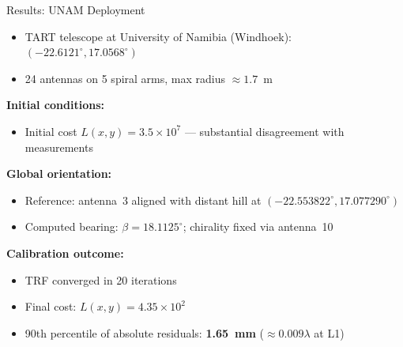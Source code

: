 \documentclass[ignorenonframetext]{beamer}
\begin{document}
\begin{frame}{Results: UNAM Deployment}
\vspace{-4pt}
\begin{itemize}
  \item TART telescope at University of Namibia (Windhoek): $(-22.6121^\circ, 17.0568^\circ)$
  \item 24 antennas on 5 spiral arms, max radius $\approx 1.7$~m
\end{itemize}
\vspace{4pt}
\textbf{Initial conditions:}
\begin{itemize}
  \item Initial cost $L(x,y) = 3.5 \times 10^7$ --- substantial disagreement with measurements
\end{itemize}
\vspace{4pt}
\textbf{Global orientation:}
\begin{itemize}
  \item Reference: antenna~3 aligned with distant hill at $(-22.553822^\circ, 17.077290^\circ)$
  \item Computed bearing: $\beta = 18.1125^\circ$; chirality fixed via antenna~10
\end{itemize}
\vspace{4pt}
\textbf{Calibration outcome:}
\begin{itemize}
  \item TRF converged in 20 iterations
  \item Final cost: $L(x,y) = 4.35 \times 10^2$
  \item 90th percentile of absolute residuals: \textbf{1.65~mm} ($\approx 0.009\lambda$ at L1)
\end{itemize}
\end{frame}



\end{document}
